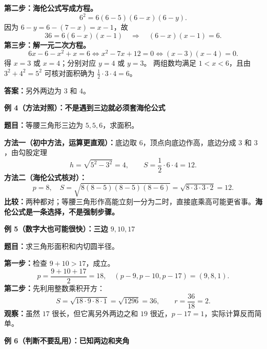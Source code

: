 \begin{examplebox}
  \textbf{第二步：海伦公式写成方程。}
  \[
    6^2=6(6-5)(6-x)(6-y).
  \]
  因为 $6-y=6-(7-x)=x-1$，故
  \[
    36=6(6-x)(x-1)
    \quad\Longrightarrow\quad(6-x)(x-1)=6.
  \]
  \textbf{第三步：解一元二次方程。}
  \[
    6x-6-x^2+x=6
    \Longleftrightarrow x^2-7x+12=0
    \Longleftrightarrow (x-3)(x-4)=0.
  \]
  得 $x=3$ 或 $x=4$；分别对应 $y=4$ 或 $y=3$。
  两组数均满足 $1<x<6$，且由 $3^2+4^2=5^2$ 可核对面积确为 $\tfrac12\cdot3\cdot4=6$。

  \textbf{答案：}另外两边为 $\boxed{3\text{ 和 }4}$。

  \medskip
\par\noindent\begin{minipage}{\linewidth}
  \textbf{\textcolor{CExample}{例 4（方法对照）：不是遇到三边就必须套海伦公式}}

  \textbf{题目：}等腰三角形三边为 $5,5,6$，求面积。


\end{minipage}\par
  \textbf{方法一（初中方法，运算更直观）：}底边取 $6$，顶点向底边作高，底边分成 $3$ 和 $3$，由勾股定理
  \[
   h=\sqrt{5^2-3^2}=4,\qquad S=\frac12\cdot6\cdot4=\boxed{12}.
  \]
  \textbf{方法二（海伦公式核对）：}
  \[
   p=8,\quad S=\sqrt{8(8-5)(8-5)(8-6)}
    =\sqrt{8\cdot3\cdot3\cdot2}=\boxed{12}.
  \]
  \textbf{比较：}两种都对；等腰三角形作高能立刻一分为二时，直接底乘高可能更省事。\textbf{海伦公式是一条选择，不是强制步骤。}

  \medskip
\par\noindent\begin{minipage}{\linewidth}
  \textbf{\textcolor{CExample}{例 5（数字大也可能很快）：三边 $9,10,17$}}

  \textbf{题目：}求三角形面积和内切圆半径。

\end{minipage}\par
  \textbf{第一步：}检查 $9+10>17$，成立。
  \[
   p=\frac{9+10+17}{2}=18,
   \quad (p-9,p-10,p-17)=(9,8,1).
  \]
  \textbf{第二步：}先利用整数乘积开方：
  \[
   S=\sqrt{18\cdot9\cdot8\cdot1}
    =\sqrt{1296}=\boxed{36},
   \qquad r=\frac{36}{18}=\boxed2.
  \]
  \textbf{观察：}虽然 $17$ 很长，但它离另外两边之和 $19$ 很近，$p-17=1$，实际计算反而简单。

  \medskip
\par\noindent\begin{minipage}{\linewidth}
  \textbf{\textcolor{CExample}{例 6（判断不要乱用）：已知两边和夹角}}


\end{minipage}
\end{examplebox}
